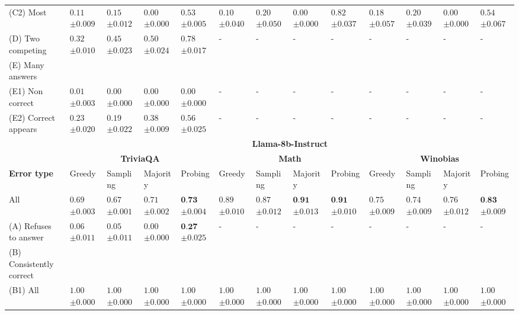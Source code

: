 \begin{table}[t]
{\begin{tabular}{l|llll|llll|llll}
        \hspace{1em} (C2) Most & $0.11$ \tiny $\pm 0.009$ & $0.15$ \tiny $\pm 0.012$ & $0.00$ \tiny $\pm 0.000$ & $0.53$ \tiny $\pm 0.005$ & $0.10$ \tiny $\pm 0.040$ & $0.20$ \tiny $\pm 0.050$ & $0.00$ \tiny $\pm 0.000$ & $0.82$ \tiny $\pm 0.037$ & $0.18$ \tiny $\pm 0.057$ & $0.20$ \tiny $\pm 0.039$ & $0.00$ \tiny $\pm 0.000$ & $0.54$ \tiny $\pm 0.067$ \\
         (D) Two competing & $0.32$ \tiny $\pm 0.010$ & $0.45$ \tiny $\pm 0.023$ & $0.50$ \tiny $\pm 0.024$ & $0.78$ \tiny $\pm 0.017$ & - & - & - & -  & - & - & - & - \\
         (E) Many answers  \\
         \hspace{1em} (E1) Non correct & $0.01$ \tiny $\pm 0.003$ & $0.00$ \tiny $\pm 0.000$ & $0.00$ \tiny $\pm 0.000$ & $0.00$ \tiny $\pm 0.000$ & - & - & - & -  & - & - & - & - \\
         \hspace{1em} (E2) Correct appears & $0.23$ \tiny $\pm 0.020$ & $0.19$ \tiny $\pm 0.022$ & $0.38$ \tiny $\pm 0.009$ & $0.56$ \tiny $\pm 0.025$ & - & - & - & -  & - & - & - & - \\
         \midrule
     & \multicolumn{12}{c}{\textbf{Llama-8b-Instruct}} \\
    \cmidrule(lr){2-13}
             & \multicolumn{4}{c}{\textbf{TriviaQA}} & \multicolumn{4}{c}{\textbf{Math}} & \multicolumn{4}{c}{\textbf{Winobias}} \\
    \cmidrule(lr){2-5} \cmidrule(lr){6-9} \cmidrule(lr){10-13}
       \textbf{Error type}  & Greedy & Sampling & Majority & Probing & Greedy & Sampling & Majority & Probing & Greedy & Sampling & Majority & Probing \\
       \midrule
         All & $0.69$ \tiny $\pm 0.003$ & $0.67$ \tiny $\pm 0.001$ & $0.71$ \tiny $\pm 0.002$ & $\textbf{0.73}$ \tiny $\pm 0.004$ & $0.89$ \tiny $\pm 0.010$ & $0.87$ \tiny $\pm 0.012$ & $\textbf{0.91}$ \tiny $\pm 0.013$ & $\textbf{0.91}$ \tiny $\pm 0.010$ & $0.75$ \tiny $\pm 0.009$ & $0.74$ \tiny $\pm 0.009$ & $0.76$ \tiny $\pm 0.012$ & $\textbf{0.83}$ \tiny $\pm 0.009$ \\
         (A) Refuses to answer & $0.06$ \tiny $\pm 0.011$ & $0.05$ \tiny $\pm 0.011$ & $0.00$ \tiny $\pm 0.000$ & $\textbf{0.27}$ \tiny $\pm 0.025$ & - & - & - & - & - & - & - & - \\
         (B) Consistently correct & \\
         \hspace{1em} (B1) All & $1.00$ \tiny $\pm 0.000$ & $1.00$ \tiny $\pm 0.000$ & $1.00$ \tiny $\pm 0.000$ & $1.00$ \tiny $\pm 0.000$ & $1.00$ \tiny $\pm 0.000$ & $1.00$ \tiny $\pm 0.000$ & $1.00$ \tiny $\pm 0.000$ & $1.00$ \tiny $\pm 0.000$ & $1.00$ \tiny $\pm 0.000$ & $1.00$ \tiny $\pm 0.000$ & $1.00$ \tiny $\pm 0.000$ & $1.00$ \tiny $\pm 0.000$ \\

\end{tabular}}
\end{table}
